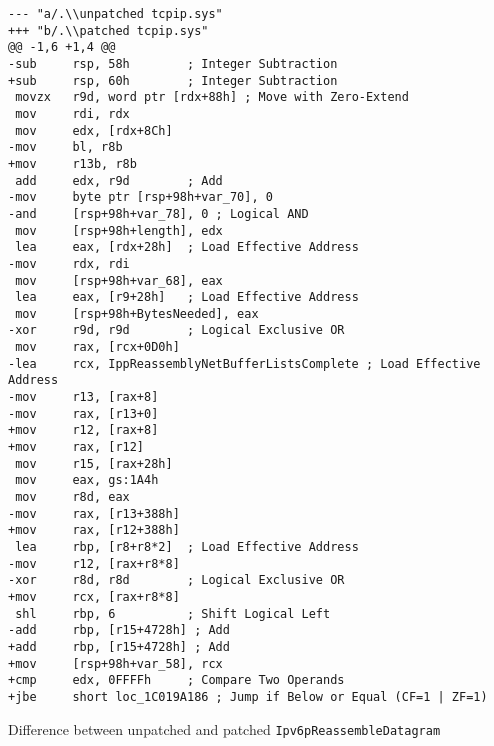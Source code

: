 \documentclass{report}
\begin{document}
\begin{listing}
    \begin{verbatim}
--- "a/.\\unpatched tcpip.sys"
+++ "b/.\\patched tcpip.sys"
@@ -1,6 +1,4 @@
-sub     rsp, 58h        ; Integer Subtraction
+sub     rsp, 60h        ; Integer Subtraction
 movzx   r9d, word ptr [rdx+88h] ; Move with Zero-Extend
 mov     rdi, rdx
 mov     edx, [rdx+8Ch]
-mov     bl, r8b
+mov     r13b, r8b
 add     edx, r9d        ; Add
-mov     byte ptr [rsp+98h+var_70], 0
-and     [rsp+98h+var_78], 0 ; Logical AND
 mov     [rsp+98h+length], edx
 lea     eax, [rdx+28h]  ; Load Effective Address
-mov     rdx, rdi
 mov     [rsp+98h+var_68], eax
 lea     eax, [r9+28h]   ; Load Effective Address
 mov     [rsp+98h+BytesNeeded], eax
-xor     r9d, r9d        ; Logical Exclusive OR
 mov     rax, [rcx+0D0h]
-lea     rcx, IppReassemblyNetBufferListsComplete ; Load Effective Address
-mov     r13, [rax+8]
-mov     rax, [r13+0]
+mov     r12, [rax+8]
+mov     rax, [r12]
 mov     r15, [rax+28h]
 mov     eax, gs:1A4h
 mov     r8d, eax
-mov     rax, [r13+388h]
+mov     rax, [r12+388h]
 lea     rbp, [r8+r8*2]  ; Load Effective Address
-mov     r12, [rax+r8*8]
-xor     r8d, r8d        ; Logical Exclusive OR
+mov     rcx, [rax+r8*8]
 shl     rbp, 6          ; Shift Logical Left
-add     rbp, [r15+4728h] ; Add
+add     rbp, [r15+4728h] ; Add
+mov     [rsp+98h+var_58], rcx
+cmp     edx, 0FFFFh     ; Compare Two Operands
+jbe     short loc_1C019A186 ; Jump if Below or Equal (CF=1 | ZF=1)
\end{verbatim}
\caption{Difference between unpatched and patched \texttt{Ipv6pReassembleDatagram}}
\label{listing:diff:Ipv6pReassembleDatagram}
\end{listing}
\end{document}
